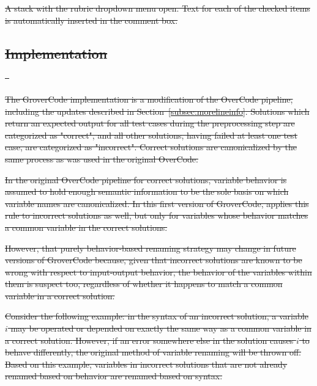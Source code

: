 \documentclass[12pt,twoside]{mitthesis}
\providecommand{\DIFdeltex}[1]{{\protect\color{red}\sout{#1}}}                      %
\providecommand{\DIFdelFL}[1]{\DIFdel{#1}} %
\providecommand{\DIFdel}[1]{\texorpdfstring{\DIFdeltex{#1}}{}} %
\begin{document}
{{{{{{{{{{%
{%
\DIFdelFL{A stack with the rubric dropdown menu open. Text for each of the checked items is automatically inserted in the comment box.}}

\subsection{\DIFdel{Implementation}}%
\addtocounter{subsection}{-1}%
\DIFdel{~}%

\DIFdel{The GroverCode implementation is a modification of the OverCode pipeline, including the updates described in Section~\ref{subsec:morelineinfo}. Solutions which return an expected output for all test cases during the preprocessing step are categorized as "correct", and all other solutions, having failed at least one test case, are categorized as "incorrect". Correct solutions are canonicalized by the same process as was used in the original OverCode. 
}%

\DIFdel{In the original OverCode pipeline for correct solutions, variable behavior is assumed to hold enough semantic information to be the sole basis on which variable names are canonicalized. In this first version of GroverCode, applies this rule to incorrect solutions as well, but only for variables whose behavior matches a common variable in the correct solutions. %
}%

\DIFdel{However, that purely behavior-based renaming strategy may change in future versions of GroverCode because, given that incorrect solutions are known to be wrong with respect to input-output behavior, the behavior of the variables within them is suspect too, regardless of whether it happens to match a common variable in a correct solution.
}%

\DIFdel{Consider the following example: in the syntax of an incorrect solution, a variable $i$ may be operated or depended on exactly the same way as a common variable in a correct solution. However, if an error somewhere else in the solution causes $i$ to behave differently, the original method of variable renaming will be thrown off. Based on this example, variables in incorrect solutions that are not already renamed based on behavior are renamed based on syntax.
}%

}}}}}}}}}}
\end{document}
